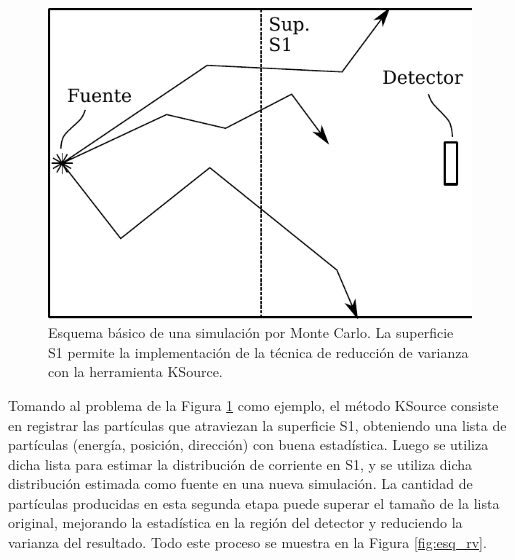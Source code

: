\begin{figure}[htbp!]
    \centering
    \includegraphics[width=.7\textwidth]{figs/esquema_simul.pdf}
    \caption{Esquema básico de una simulación por Monte Carlo. La superficie S1 permite la implementación de la técnica de reducción de varianza con la herramienta KSource.}
    \label{fig:esq_mc}
\end{figure}

Tomando al problema de la Figura \ref{fig:esq_mc} como ejemplo, el método KSource consiste en registrar las partículas que atraviezan la superficie S1, obteniendo una lista de partículas (energía, posición, dirección) con buena estadística. Luego se utiliza dicha lista para estimar la distribución de corriente en S1, y se utiliza dicha distribución estimada como fuente en una nueva simulación. La cantidad de partículas producidas en esta segunda etapa puede superar el tamaño de la lista original, mejorando la estadística en la región del detector y reduciendo la varianza del resultado. Todo este proceso se muestra en la Figura \ref{fig:esq_rv}. 


